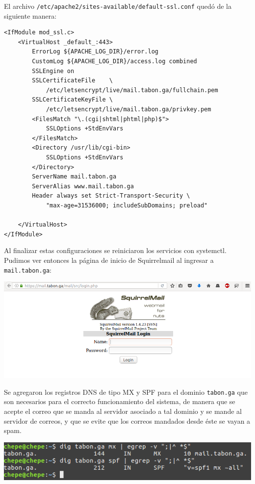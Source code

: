 \documentclass[9pt]{article}
\begin{document}
El archivo \texttt{/etc/apache2/sites-available/default-ssl.conf} quedó de la siguiente manera:
\begin{verbatim}
<IfModule mod_ssl.c>
    <VirtualHost _default_:443>
        ErrorLog ${APACHE_LOG_DIR}/error.log
        CustomLog ${APACHE_LOG_DIR}/access.log combined
        SSLEngine on
        SSLCertificateFile    \
            /etc/letsencrypt/live/mail.tabon.ga/fullchain.pem
        SSLCertificateKeyFile \
            /etc/letsencrypt/live/mail.tabon.ga/privkey.pem
        <FilesMatch "\.(cgi|shtml|phtml|php)$">
            SSLOptions +StdEnvVars
        </FilesMatch>
        <Directory /usr/lib/cgi-bin>
            SSLOptions +StdEnvVars
        </Directory>
        ServerName mail.tabon.ga
        ServerAlias www.mail.tabon.ga
        Header always set Strict-Transport-Security \
            "max-age=31536000; includeSubDomains; preload"
 
    </VirtualHost>
</IfModule>
\end{verbatim}

Al finalizar estas configuraciones se reiniciaron los servicios con \textsf{systemctl}. \\

Pudimos ver entonces la página de inicio de Squirrelmail al ingresar a \texttt{mail.tabon.ga}: \\
\begin{center}
\includegraphics[scale=0.4]{mail/04} \\
\end{center}

Se agregaron los registros DNS de tipo MX y SPF para el dominio \texttt{tabon.ga} que son necesarios para el correcto funcionamiento del sistema, de manera que se acepte el correo que se manda al servidor asociado a tal dominio y se mande al servidor de correos, y que se evite que los correos mandados desde éste se vayan a spam. \\

\begin{center}
\includegraphics[scale=0.5]{mail/01} \\
\end{center}
\end{document}
